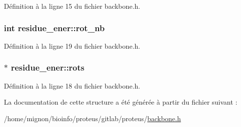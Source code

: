 Définition à la ligne 15 du fichier backbone.\+h.

\hypertarget{structresidue__ener_a36eee97018204ef62d6e0f3cd31926f4}{
\subsubsection[{rot\+\_\+nb}]{\setlength{\rightskip}{0pt plus 5cm}int residue\+\_\+ener\+::rot\+\_\+nb}}\label{structresidue__ener_a36eee97018204ef62d6e0f3cd31926f4}


Définition à la ligne 19 du fichier backbone.\+h.

\hypertarget{structresidue__ener_af19665d2d44e75b3cdce0354151bf40b}{
\subsubsection[{rots}]{$\ast$ residue\+\_\+ener\+::rots}}\label{structresidue__ener_af19665d2d44e75b3cdce0354151bf40b}


Définition à la ligne 18 du fichier backbone.\+h.



La documentation de cette structure a été générée à partir du fichier suivant \+:\begin{DoxyCompactItemize}
\item 
/home/mignon/bioinfo/proteus/gitlab/proteus/\hyperlink{backbone_8h}{backbone.\+h}\end{DoxyCompactItemize}
